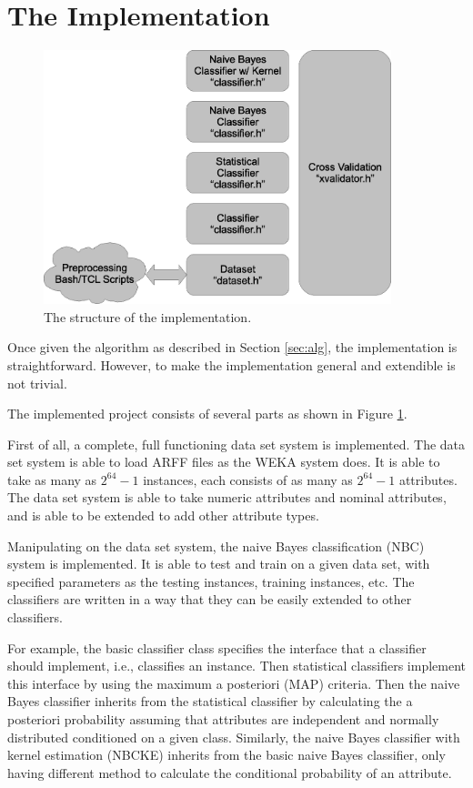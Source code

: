 \documentclass[a4paper,12pt]{article}
\begin{document}
\section{The Implementation}
\label{sec:imp}
\begin{figure}[tbp]
    \centering
    \includegraphics[width=0.9\textwidth]{pic/struct.eps}
    \caption{The structure of the implementation.}
    \label{fig:struct}
\end{figure} 
Once given the algorithm as described in Section \ref{sec:alg}, the implementation is straightforward. However, to make the implementation general and extendible is not trivial.

The implemented project consists of several parts as shown in Figure \ref{fig:struct}.

First of all, a complete, full functioning data set system is implemented. The data set system is able to load ARFF files as the WEKA system does. It is able to take as many as $2^{64}-1$ instances, each consists of as many as $2^{64}-1$ attributes. The data set system is able to take numeric attributes and nominal attributes, and is able to be extended to add other attribute types. 

Manipulating on the data set system, the naive Bayes classification (NBC) system is implemented. It is able to test and train on a given data set, with specified parameters as the testing instances, training instances, etc. The classifiers are written in a way that they can be easily extended to other classifiers. 

For example, the basic classifier class specifies the interface that a classifier should implement, i.e., classifies an instance. Then statistical classifiers implement this interface by using the maximum a posteriori (MAP) criteria. Then the naive Bayes classifier inherits from the statistical classifier by calculating the a posteriori probability assuming that attributes are independent and normally distributed conditioned on a given class. Similarly, the naive Bayes classifier with kernel estimation (NBCKE) inherits from the basic naive Bayes classifier, only having different method to calculate the conditional probability of an attribute. 
\end{document}
